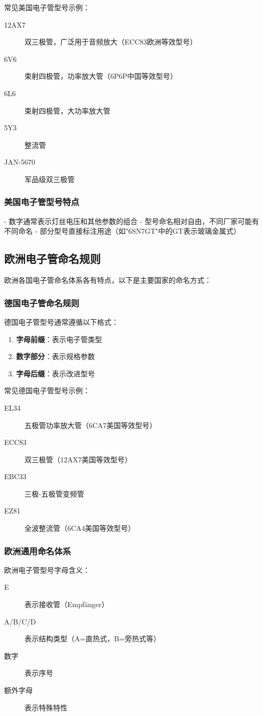 \documentclass[12pt,UTF8]{ctexbook}
\begin{document}
常见美国电子管型号示例：
\begin{description}
    \item[12AX7] 双三极管，广泛用于音频放大（ECC83欧洲等效型号）
    \item[6V6] 束射四极管，功率放大管（6P6P中国等效型号）
    \item[6L6] 束射四极管，大功率放大管
    \item[5Y3] 整流管
    \item[JAN-5670] 军品级双三极管
\end{description}

\subsubsection{美国电子管型号特点}
- 数字通常表示灯丝电压和其他参数的组合
- 型号命名相对自由，不同厂家可能有不同命名
- 部分型号直接标注用途（如"6SN7GT"中的GT表示玻璃金属式）

\subsection{欧洲电子管命名规则}

欧洲各国电子管命名体系各有特点，以下是主要国家的命名方式：

\subsubsection{德国电子管命名规则}
德国电子管型号通常遵循以下格式：
\begin{enumerate}
    \item \textbf{字母前缀}：表示电子管类型
    \item \textbf{数字部分}：表示规格参数
    \item \textbf{字母后缀}：表示改进型号
\end{enumerate}

常见德国电子管型号示例：
\begin{description}
    \item[EL34] 五极管功率放大管（6CA7美国等效型号）
    \item[ECC83] 双三极管（12AX7美国等效型号）
    \item[EBC33] 三极-五极管变频管
    \item[EZ81] 全波整流管（6CA4美国等效型号）
\end{description}

\subsubsection{欧洲通用命名体系}
欧洲电子管型号字母含义：
\begin{description}
    \item[E] 表示接收管（Empfänger）
    \item[A/B/C/D] 表示结构类型（A=直热式，B=旁热式等）
    \item[数字] 表示序号
    \item[额外字母] 表示特殊特性
\end{description}
\end{document}
